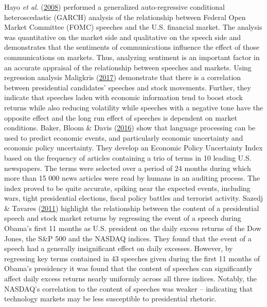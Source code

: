 \documentclass[11pt,preprint, authoryear]{elsarticle}
\numberwithin{equation}{section}
\numberwithin{figure}{section}
\numberwithin{table}{section}
\begin{document}
Hayo \emph{et al.} (\protect\hyperlink{ref-hayo2008communicating}{2008})
performed a generalized auto-regressive conditional heteroscedastic
(GARCH) analysis of the relationship between Federal Open Market
Committee (FOMC) speeches and the U.S. financial market. The analysis
was quantitative on the market side and qualitative on the speech side
and demonstrates that the sentiments of communications influence the
effect of those communications on markets. Thus, analyzing sentiment is
an important factor in an accurate appraisal of the relationship between
speeches and markets. Using regression analysis Maligkris
(\protect\hyperlink{ref-maligkris2017political}{2017}) demonstrate that
there is a correlation between presidential candidates' speeches and
stock movements. Further, they indicate that speeches laden with
economic information tend to boost stock returns while also reducing
volatility while speeches with a negative tone have the opposite effect
and the long run effect of speeches is dependent on market conditions.
Baker, Bloom \& Davis (\protect\hyperlink{ref-baker2016measuring}{2016})
show that language processing can be used to predict economic events,
and particularly economic uncertainty and economic policy uncertainty.
They develop an Economic Policy Uncertainty Index based on the frequency
of articles containing a trio of terms in 10 leading U.S. newspapers.
The terms were selected over a period of 24 months during which more
than 15 000 news articles were read by humans in an auditing process.
The index proved to be quite accurate, spiking near the expected events,
including wars, tight presidential elections, fiscal policy battles and
terrorist activity. Sazedj \& Tavares
(\protect\hyperlink{ref-sazedj2011hope}{2011}) highlight the
relationship between the content of a presidential speech and stock
market returns by regressing the event of a speech during Obama's first
11 months as U.S. president on the daily excess returns of the Dow
Jones, the S\&P 500 and the NASDAQ indices. They found that the event of
a speech had a generally insignificant effect on daily excesses.
However, by regressing key terms contained in 43 speeches given during
the first 11 months of Obama's presidency it was found that the content
of speeches can significantly affect daily excess returns nearly
uniformly across all three indices. Notably, the NASDAQ's correlation to
the content of speeches was weaker -- indicating that technology markets
may be less susceptible to presidential rhetoric.
\end{document}
